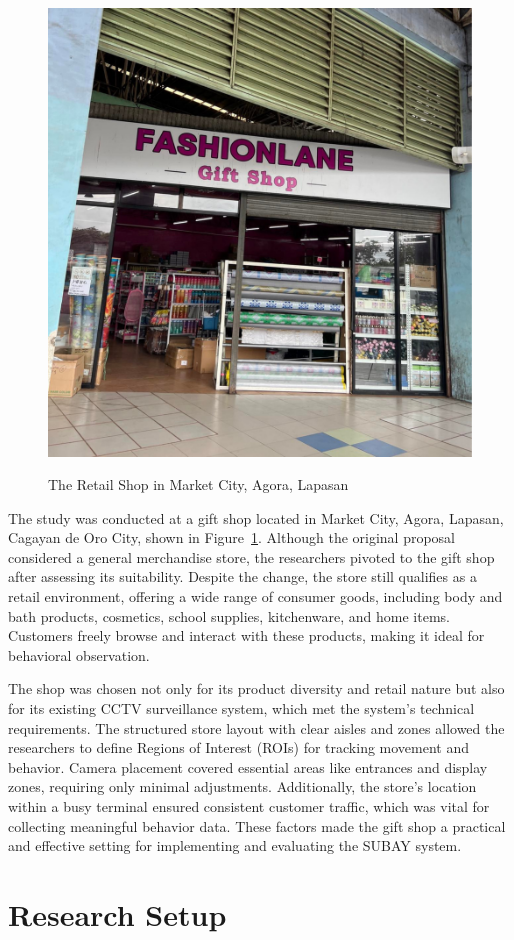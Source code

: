 {\begin{figure}[H]
	\caption[The Retail Shop in Market City, Agora, Lapasan]{\newline \newline The Retail Shop in Market City, Agora, Lapasan}
	\centering
	\includegraphics[width=0.5\linewidth]{fig/3.2.pdf}
	\label{figs:3.2}
\end{figure}

The study was conducted at a gift shop located in Market City, Agora, Lapasan, Cagayan de Oro City, shown in Figure~\ref{figs:3.2}. Although the original proposal considered a general merchandise store, the researchers pivoted to the gift shop after assessing its suitability. Despite the change, the store still qualifies as a retail environment, offering a wide range of consumer goods, including body and bath products, cosmetics, school supplies, kitchenware, and home items. Customers freely browse and interact with these products, making it ideal for behavioral observation.

The shop was chosen not only for its product diversity and retail nature but also for its existing CCTV surveillance system, which met the system’s technical requirements. The structured store layout with clear aisles and zones allowed the researchers to define Regions of Interest (ROIs) for tracking movement and behavior. Camera placement covered essential areas like entrances and display zones, requiring only minimal adjustments. Additionally, the store’s location within a busy terminal ensured consistent customer traffic, which was vital for collecting meaningful behavior data. These factors made the gift shop a practical and effective setting for implementing and evaluating the SUBAY system.

\section{Research Setup}

}
